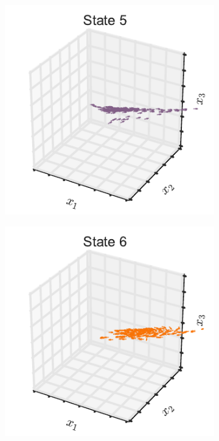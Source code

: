 \documentclass{article}
\begin{document}
\begin{figure}[th!]
\begin{subfigure}[b]{0.32\linewidth}
  \end{subfigure}
  \begin{subfigure}[b]{0.32\linewidth}
    \includegraphics[width=\textwidth]{dynamics_3d_4.pdf}
  \end{subfigure}
  \begin{subfigure}[b]{0.32\linewidth}
    \includegraphics[width=\textwidth]{dynamics_3d_5.pdf}

\end{subfigure}
\end{figure}
\end{document}
